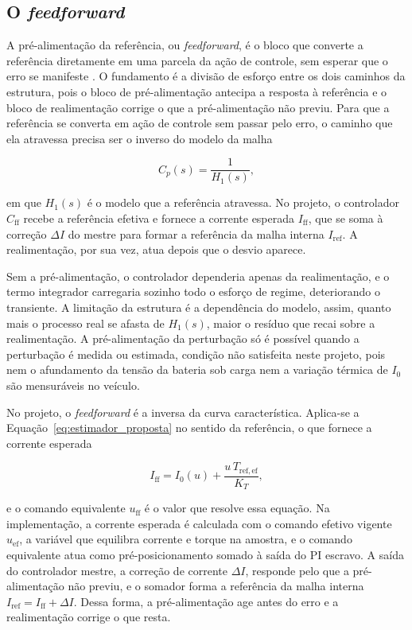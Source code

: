\subsection{O \emph{feedforward}}
\label{sec:feedforward}

A pré-alimentação da referência, ou \emph{feedforward}, é o bloco que converte a
referência diretamente em uma parcela da ação de controle, sem esperar que o erro se
manifeste \cite{raffo_tcpi_psrprp}. O fundamento é a divisão de esforço entre os dois
caminhos da estrutura, pois o bloco de pré-alimentação antecipa a
resposta à referência e o bloco de realimentação corrige o que a pré-alimentação não
previu. Para que a referência se converta em ação de controle sem passar pelo erro, o
caminho que ela atravessa precisa ser o inverso do modelo da malha

\begin{equation}\label{eq:controlador_ideal}
C_p(s) = \frac{1}{H_1(s)},
\end{equation}

em que $H_1(s)$ é o modelo que a referência atravessa. No
projeto, o controlador $C_{\mathrm{ff}}$ recebe a referência efetiva e fornece a corrente esperada
$I_{\mathrm{ff}}$, que se soma à correção $\Delta I$ do mestre para formar a referência
da malha interna $I_{\mathrm{ref}}$. A realimentação, por sua vez, atua depois que o
desvio aparece.

Sem a pré-alimentação, o controlador dependeria apenas da realimentação, e o termo
integrador carregaria sozinho todo o esforço de regime, deteriorando o transiente. A
limitação da estrutura é a dependência do modelo, assim, quanto mais o processo real se afasta
de $H_1(s)$, maior o resíduo que recai sobre a realimentação. A pré-alimentação da
perturbação só é possível quando a perturbação é medida ou estimada, condição não
satisfeita neste projeto, pois nem o
afundamento da tensão da bateria sob carga nem a variação
térmica de $I_0$ são mensuráveis no veículo.

No projeto, o \emph{feedforward} é a inversa da curva característica. Aplica-se a
Equação~\eqref{eq:estimador_proposta} no sentido da referência, o que fornece a
corrente esperada

\begin{equation}\label{eq:iff}
I_{\mathrm{ff}} = I_0(u) + \frac{u\,T_{\mathrm{ref,ef}}}{K_T},
\end{equation}

e o comando equivalente $u_{\mathrm{ff}}$ é o valor que resolve essa equação. Na
implementação, a corrente esperada é calculada com o comando efetivo vigente
$u_{\mathrm{ef}}$, a variável que equilibra corrente e torque na amostra, e o comando
equivalente atua como pré-posicionamento somado à saída do PI escravo. A saída
do controlador mestre, a correção de corrente $\Delta I$, responde pelo que a
pré-alimentação não previu, e o somador forma a referência da malha interna
$I_{\mathrm{ref}} = I_{\mathrm{ff}} + \Delta I$. Dessa forma, a pré-alimentação age antes do
erro e a realimentação corrige o que resta.

